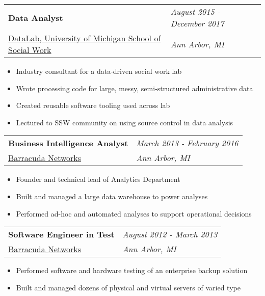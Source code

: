 \documentclass[margin,line]{res}
\begin{document}
\begin{resume}
\begin{tabular}{p{4.4in} l}
  {\bf Data Analyst} & \emph{August 2015 - December 2017}\\
  \href{http://www.ssw-datalab.org/}{DataLab, University of Michigan School of Social Work} & \emph{Ann Arbor, MI}
\end{tabular}
\vspace{2pt}
\begin{itemize}\itemsep -2pt
  \item Industry consultant for a data-driven social work lab
  \item Wrote processing code for large, messy, semi-structured administrative data
  \item Created reusable software tooling used across lab
  \item Lectured to SSW community on using source control in data analysis
\end{itemize}

\begin{tabular}{p{4.4in} l}
  {\bf Business Intelligence Analyst} & \emph{March 2013 - February 2016}\\
  \href{https://www.barracuda.com/}{Barracuda Networks} & \emph{Ann Arbor, MI}
\end{tabular}
\vspace{2pt}
\begin{itemize}\itemsep -2pt
  \item Founder and technical lead of Analytics Department
  \item Built and managed a large data warehouse to power analyses
  \item Performed ad-hoc and automated analyses to support operational decisions
\end{itemize}

\begin{tabular}{p{4.4in} l}
  {\bf Software Engineer in Test} & \emph{August 2012 - March 2013}\\
  \href{https://www.barracuda.com/}{Barracuda Networks} & \emph{Ann Arbor, MI}
\end{tabular}
\vspace{2pt}
\begin{itemize}\itemsep -2pt
  \item Performed software and hardware testing of an enterprise backup solution
  \item Built and managed dozens of physical and virtual servers of varied type
\end{itemize}


\end{resume}
\end{document}
